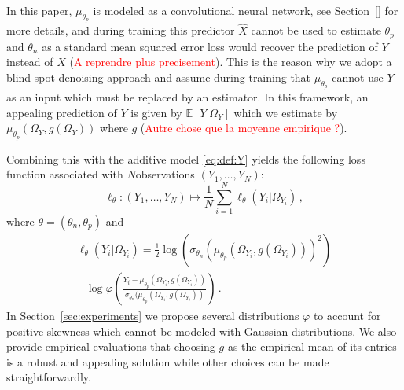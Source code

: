 \documentclass{article}
\begin{document}
In this paper, $\mu_{\theta_p}$ is modeled as a convolutional neural network, see Section~\ref{} for more details, and during training this predictor $\widehat X$ cannot be used to estimate $\theta_p$ and $\theta_n$ as  a standard mean squared error loss would recover the prediction of $Y$ instead of $X$ (\textcolor{red}{A reprendre plus precisement}). This is the reason why we adopt a blind spot denoising approach and assume during training that $\mu_{\theta_p}$ cannot use $Y$ as an input which must be replaced by an estimator. In this framework, an appealing prediction of $Y$ is given by $\mathbb{E}[Y|\Omega_Y]$ which we estimate by $\mu_{\theta_p}(\Omega_Y,g(\Omega_Y))$ where $g$ (\textcolor{red}{Autre chose que la moyenne empirique ?}).

Combining this with the additive model  \eqref{eq:def:Y} yields the following loss function associated with $N$observations $(Y_1,\ldots,Y_N)$:
$$
\ell_{\theta}: (Y_1,\ldots,Y_N) \mapsto \frac{1}{N}\sum_{i=1}^N \ell_{\theta}(Y_i|\Omega_{Y_i})\,,
$$
where $\theta = (\theta_n,\theta_p)$ and
\begin{multline*}
\ell_{\theta}(Y_i|\Omega_{Y_i}) = \frac{1}{2}\log(\sigma_{\theta_n}( \mu_{\theta_p}(\Omega_{Y_i},g(\Omega_{Y_i})))^2) \\
-\log \varphi\left(\frac{Y_i-\mu_{\theta_p}(\Omega_{Y_i},g(\Omega_{Y_i}))}{\sigma_{\theta_n}(\mu_{\theta_p}(\Omega_{Y_i},g(\Omega_{Y_i}))}\right)\,. %
\end{multline*}
In Section~\ref{sec:experiments} we propose several distributions $\varphi$ to account for positive skewness which cannot be modeled with Gaussian distributions. We also provide empirical evaluations that choosing $g$ as the empirical mean of its entries is a robust and appealing solution while other choices can be made straightforwardly.
\end{document}
